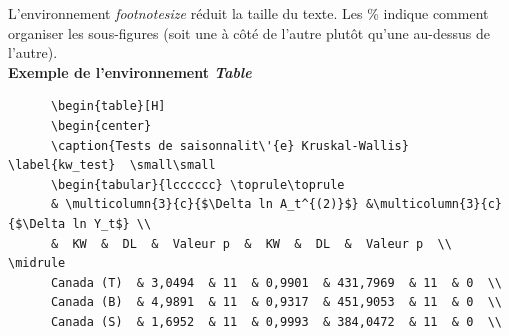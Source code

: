 \documentclass[12pt]{article}
\begin{document}
   L'environnement \textit{footnotesize} réduit la taille du texte. Les \% indique comment organiser les sous-figures (soit une à côté de l'autre plutôt qu'une au-dessus de l'autre). \\
   
   \textbf{Exemple de l'environnement \textit{Table}} \\
   
   \begin{lstlisting}
      \begin{table}[H]
      \begin{center}
      \caption{Tests de saisonnalit\'{e} Kruskal-Wallis} \label{kw_test}  \small\small                                                                                                                                                                                                    
      \begin{tabular}{lcccccc} \toprule\toprule                                                                                                                                                                                                                                           
      & \multicolumn{3}{c}{$\Delta ln A_t^{(2)}$} &\multicolumn{3}{c}{$\Delta ln Y_t$} \\                                                                                                                                                                                                 
      &  KW  &  DL  &  Valeur p  &  KW  &  DL  &  Valeur p  \\ \midrule                                                                                                                                                                                                                   
      Canada (T)  & 3,0494  & 11  & 0,9901  & 431,7969  & 11  & 0  \\                                                                                                                                                                                                                     
      Canada (B)  & 4,9891  & 11  & 0,9317  & 451,9053  & 11  & 0  \\                                                                                                                                                                                                                     
      Canada (S)  & 1,6952  & 11  & 0,9993  & 384,0472  & 11  & 0  \\                                                                                                                                                                                                                     

\end{lstlisting}
\end{document}
